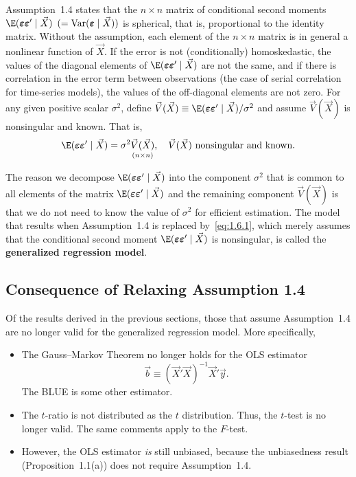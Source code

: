 
Assumption~1.4 states that the $n \times n$ matrix of conditional second moments
$\E(\bm{\varepsilon}\bm{\varepsilon}' \mid \vec{X})$ $(= \operatorname{Var}(\bm{\varepsilon} \mid \vec{X}))$
is spherical, that is, proportional to the identity matrix.  Without the assumption,
each element of the $n \times n$ matrix is in general a nonlinear function of $\vec{X}$.
If the error is not (conditionally) homoskedastic, the values of the diagonal elements
of $\E(\bm{\varepsilon}\bm{\varepsilon}' \mid \vec{X})$ are not the same, and if there is
correlation in the error term between observations (the case of serial correlation for
time-series models), the values of the off-diagonal elements are not zero.  For any
given positive scalar $\sigma^2$, define
$\vec{V}(\vec{X}) \equiv \E(\bm{\varepsilon}\bm{\varepsilon}' \mid \vec{X})/\sigma^2$
and assume $\vec{V}(\vec{X})$ is nonsingular and known.  That is,
%
\begin{equation}
  \E(\bm{\varepsilon}\bm{\varepsilon}' \mid \vec{X})
    = \sigma^2 \underset{(n \times n)}{\vec{V}(\vec{X})}, \quad
  \vec{V}(\vec{X}) \text{ nonsingular and known.}
  \label{eq:1.6.1}
\end{equation}

The reason we decompose $\E(\bm{\varepsilon}\bm{\varepsilon}' \mid \vec{X})$ into the
component $\sigma^2$ that is common to all elements of the matrix
$\E(\bm{\varepsilon}\bm{\varepsilon}' \mid \vec{X})$ and the remaining component
$\vec{V}(\vec{X})$ is that we do not need to know the value of $\sigma^2$ for efficient
estimation.  The model that results when Assumption~1.4 is replaced by~\eqref{eq:1.6.1},
which merely assumes that the conditional second moment
$\E(\bm{\varepsilon}\bm{\varepsilon}' \mid \vec{X})$ is nonsingular, is called the
\textbf{generalized regression model}.

\subsection*{Consequence of Relaxing Assumption 1.4}

Of the results derived in the previous sections, those that assume Assumption~1.4
are no longer valid for the generalized regression model.  More specifically,
%
\begin{itemize}
  \item The Gauss--Markov Theorem no longer holds for the OLS estimator
    \[
      \vec{b} \equiv (\vec{X}'\vec{X})^{-1}\vec{X}'\vec{y}.
    \]
    The BLUE is some other estimator.

  \item The $t$-ratio is not distributed as the $t$ distribution.  Thus, the $t$-test
    is no longer valid.  The same comments apply to the $F$-test.

  \item However, the OLS estimator \emph{is} still unbiased, because the unbiasedness
    result (Proposition~1.1(a)) does not require Assumption~1.4.
\end{itemize}

